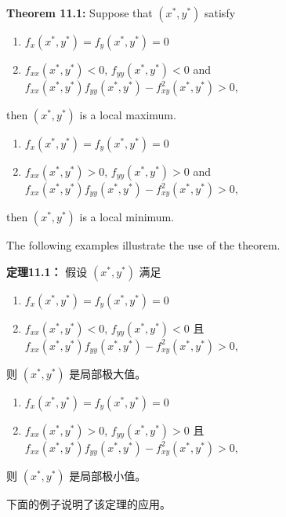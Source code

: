 \begin{original}
\textbf{Theorem 11.1:} Suppose that $(x^*, y^*)$ satisfy
\begin{enumerate}
\item[(1a)] $f_x(x^*, y^*) = f_y(x^*, y^*) = 0$
\item[(1b)] $f_{xx}(x^*, y^*) < 0$, $f_{yy}(x^*, y^*) < 0$ and $f_{xx}(x^*, y^*)f_{yy}(x^*, y^*) - f_{xy}^2(x^*, y^*) > 0$,
\end{enumerate}
then $(x^*, y^*)$ is a local maximum.
\begin{enumerate}
\item[(2a)] $f_x(x^*, y^*) = f_y(x^*, y^*) = 0$
\item[(2b)] $f_{xx}(x^*, y^*) > 0$, $f_{yy}(x^*, y^*) > 0$ and $f_{xx}(x^*, y^*)f_{yy}(x^*, y^*) - f_{xy}^2(x^*, y^*) > 0$,
\end{enumerate}
then $(x^*, y^*)$ is a local minimum.

The following examples illustrate the use of the theorem.
\end{original}
\begin{translation}
\textbf{定理11.1：} 假设 $(x^*, y^*)$ 满足
\begin{enumerate}
\item[(1a)] $f_x(x^*, y^*) = f_y(x^*, y^*) = 0$
\item[(1b)] $f_{xx}(x^*, y^*) < 0$, $f_{yy}(x^*, y^*) < 0$ 且 $f_{xx}(x^*, y^*)f_{yy}(x^*, y^*) - f_{xy}^2(x^*, y^*) > 0$,
\end{enumerate}
则 $(x^*, y^*)$ 是局部极大值。
\begin{enumerate}
\item[(2a)] $f_x(x^*, y^*) = f_y(x^*, y^*) = 0$
\item[(2b)] $f_{xx}(x^*, y^*) > 0$, $f_{yy}(x^*, y^*) > 0$ 且 $f_{xx}(x^*, y^*)f_{yy}(x^*, y^*) - f_{xy}^2(x^*, y^*) > 0$,
\end{enumerate}
则 $(x^*, y^*)$ 是局部极小值。

下面的例子说明了该定理的应用。
\end{translation}

